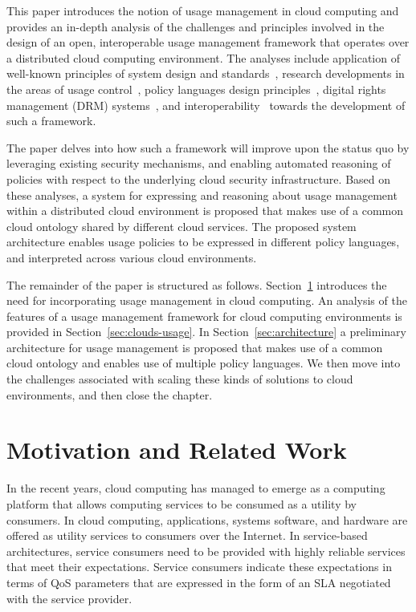 \documentclass[10pt,letterpaper]{book}
\begin{document}
This paper introduces the notion of usage management in cloud computing and provides an in-depth analysis of the challenges and principles involved in the design of an open, interoperable usage management framework that operates over a distributed cloud computing environment. The analyses include application of well-known principles of system design and standards~\cite{BlCl:01,Cl:88,ClWrSoBr:02}, research developments in the areas of usage control~\cite{PaSa:04,JaHeLa:10}, policy languages design principles~\cite{JaHeMa:06}, digital rights management (DRM) systems~\cite{JaHe:09},  and interoperability~\cite{JaHe:04,HeJa:05,KoLaMaMi:04} towards the development of such a framework.

The paper delves into how such a framework will improve upon the status quo by leveraging  existing security mechanisms, and enabling automated reasoning of policies with respect to the underlying cloud security infrastructure. Based on these analyses, a system for expressing and reasoning about usage management within a distributed cloud environment is proposed that makes use of a common cloud ontology shared by different cloud services. The proposed system architecture enables usage policies to be expressed in different policy languages, and interpreted across various cloud environments. 

The remainder of the paper is structured as follows. Section~\ref{sec:motivation} introduces the need for incorporating usage management in cloud computing. An analysis of the features of a usage management framework for cloud computing environments is provided in Section~\ref{sec:clouds-usage}. In Section~\ref{sec:architecture} a preliminary architecture for usage management is proposed that makes use of a common cloud ontology and enables use of multiple policy languages. We then move into the challenges associated with scaling these kinds of solutions to cloud environments, and then close the chapter.

\section{Motivation and Related Work}\label{sec:motivation}
In the recent years, cloud computing has  managed to emerge as a computing platform that allows computing services to be consumed as a utility by consumers. In cloud computing, applications, systems software, and hardware are offered as utility services to consumers over the Internet. In service-based architectures, service consumers need to be provided with  highly reliable services that meet their expectations. Service consumers indicate these expectations in terms of QoS parameters that are expressed in the form of an SLA negotiated with the service provider. 
\end{document}
